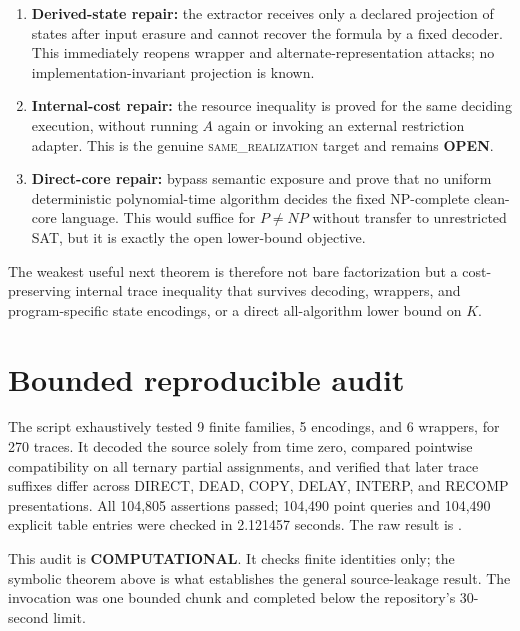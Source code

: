 \documentclass[11pt]{article}
\newcommand{\COMP}{\textbf{COMPUTATIONAL}}
\newcommand{\OPEN}{\textbf{OPEN}}
\newcommand{\same}{\textsc{same\_realization}}
\begin{document}
\begin{enumerate}[leftmargin=*]
\item \textbf{Derived-state repair:} the extractor receives only a declared
projection of states after input erasure and cannot recover the formula by a
fixed decoder.  This immediately reopens wrapper and alternate-representation
attacks; no implementation-invariant projection is known.
\item \textbf{Internal-cost repair:} the resource inequality is proved for the
same deciding execution, without running $A$ again or invoking an external
restriction adapter.  This is the genuine \same{} target and remains \OPEN.
\item \textbf{Direct-core repair:} bypass semantic exposure and prove that no
uniform deterministic polynomial-time algorithm decides the fixed NP-complete
clean-core language.  This would suffice for $P\ne NP$ without transfer to
unrestricted SAT, but it is exactly the open lower-bound objective.
\end{enumerate}

The weakest useful next theorem is therefore not bare factorization but a
cost-preserving internal trace inequality that survives decoding, wrappers,
and program-specific state encodings, or a direct all-algorithm lower bound on
$K$.

\section{Bounded reproducible audit}
The script
 exhaustively
tested 9 finite families, 5 encodings, and 6 wrappers, for 270 traces.  It
decoded the source solely from time zero, compared pointwise compatibility on
all ternary partial assignments, and verified that later trace suffixes differ
across DIRECT, DEAD, COPY, DELAY, INTERP, and RECOMP presentations.  All
104,805 assertions passed; 104,490 point queries and 104,490 explicit table
entries were checked in 2.121457 seconds.  The raw result is
.

This audit is \COMP.  It checks finite identities only; the symbolic theorem
above is what establishes the general source-leakage result.  The invocation
was one bounded chunk and completed below the repository's 30-second limit.
\end{document}
